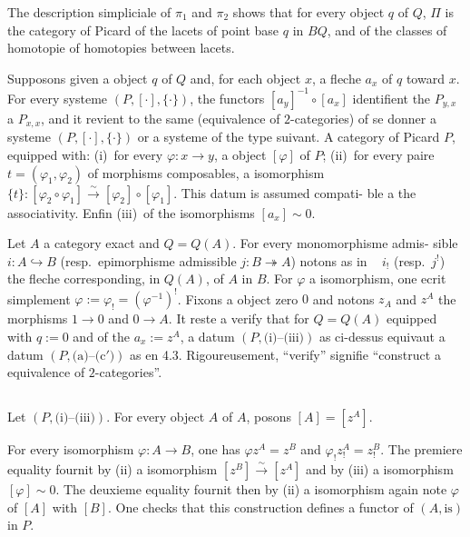 \documentclass[12pt,a4paper]{article}
\theoremstyle{plain}
\theoremstyle{definition}
\begin{document}
The description simpliciale of $\pi_1$ and $\pi_2$ shows that for every object $q$
of $Q$, $\Pi$ is the category of Picard of the lacets of point base $q$ in $BQ$,
and of the classes of homotopie of homotopies between lacets.

Supposons given a object $q$ of $Q$ and, for each object $x$, a fleche
$a_x$ of $q$ toward $x$. For every systeme $(P, [\cdot], \{\cdot\})$, the functors $[a_y]^{-1} \circ
[a_x]$ identifient the $P_{y,x}$ a $P_{x,x}$, and it revient to the same (equivalence
of $2$-categories) of se donner a systeme $(P, [\cdot], \{\cdot\})$ or a systeme of the type
suivant. A category of Picard $P$, equipped with: (i)~for every $\varphi: x \to y$, a
object $[\varphi]$ of $P$; (ii)~for every paire $t = (\varphi_1, \varphi_2)$ of morphisms composables,
a isomorphism $\{t\}: [\varphi_2 \circ \varphi_1] \xrightarrow{\sim} [\varphi_2] \circ [\varphi_1]$. This datum is assumed compati-
ble a the associativity. Enfin (iii)~of the isomorphisms $[a_x] \sim 0$.

Let $A$ a category exact and $Q = Q(A)$. For every monomorphisme admis-
sible $i: A \hookrightarrow B$ (resp.\ epimorphisme admissible $j: B \twoheadrightarrow A$) notons as in
~\cite{12} $i_!$ (resp.\ $j^!$) the fleche corresponding, in $Q(A)$, of $A$ in $B$.
For $\varphi$ a isomorphism, one ecrit simplement $\varphi := \varphi_! = (\varphi^{-1})^!$. Fixons a object
zero $0$ and notons $z_A$ and $z^A$ the morphisms $1 \to 0$ and $0 \to A$. It reste a
verify that for $Q = Q(A)$ equipped with $q := 0$ and of the $a_x := z^A$, a datum $(P,\text{(i)--(iii)})$
as ci-dessus equivaut a datum $(P,\text{(a)--(c$'$)})$ as en 4.3.
Rigoureusement, ``verify'' signifie ``construct a equivalence of $2$-categories''.

\subsection{}

Let $(P, \text{(i)--(iii)})$. For every object $A$ of $A$, posons $[A] = [z^A]$.

For every isomorphism $\varphi: A \to B$, one has $\varphi z^A = z^B$ and $\varphi_! z_!^A = z_!^B$. The premiere
equality fournit by (ii) a isomorphism $[z^B] \xrightarrow{\sim} [z^A]$ and by (iii) a isomorphism
$[\varphi] \sim 0$. The deuxieme equality fournit then by (ii) a isomorphism again note $\varphi$
of $[A]$ with $[B]$. One checks that this construction defines a functor of $(A, \text{is})$
in $P$.

\medskip
\end{document}
